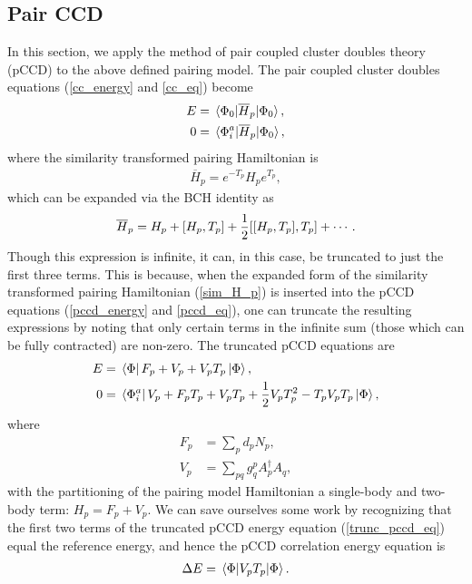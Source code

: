 \documentclass[Dual]{msu-thesis}
\begin{document}
\subsection{Pair CCD}

In this section, we apply the method of pair coupled cluster doubles theory (pCCD) to the above defined pairing model. The pair coupled cluster doubles equations (\ref{cc_energy} and \ref{cc_eq}) become
\begin{align}
\label{pccd_energy} 
E&=\mel{\Phi_0}{\overline{H}_p}{\Phi_0},
\\
\label{pccd_eq}
0&=\mel*{\Phi_i^a}{\overline{H}_p}{\Phi_0}
,\end{align}
where the similarity transformed pairing Hamiltonian is
\begin{align}
\overline{H}_p=e^{-T_p}H_pe^{T_p}
,\end{align}
which can be expanded via the BCH identity as
\begin{align}
\label{sim_H_p}
\overline{H}_p=H_p+\comm{H_p}{T_p}+\frac{1}{2}\comm{\comm{H_p}{T_p}}{T_p}+\cdots
.\end{align}
Though this expression is infinite, it can, in this case, be truncated to just the first three terms. This is because, when the expanded form of the similarity transformed pairing Hamiltonian (\ref{sim_H_p}) is inserted into the pCCD equations (\ref{pccd_energy} and \ref{pccd_eq}), one can truncate the resulting expressions by noting that only certain terms in the infinite sum (those which can be fully contracted) are non-zero. The truncated pCCD equations are
\begin{align}
\label{trunc_pccd_e}
E
&=
\bra*{\Phi}F_p+V_p+V_pT_p\ket{\Phi},
\\
\label{trunc_pccd_eq}
0
&=
\bra*{\Phi_i^a}V_p+F_pT_p+V_pT_p+\frac{1}{2}V_pT_p^2-T_pV_pT_p\ket{\Phi}
,\end{align}
where
\begin{align}
F_p
&=
\sum_pd_pN_p,
\\
V_p
&=
\sum_{pq}g^p_qA^\dagger_pA_q
,\end{align}
with the partitioning of the pairing model Hamiltonian a single-body and two-body term: $H_p=F_p+V_p$. We can save ourselves some work by recognizing that the first two terms of the truncated pCCD energy equation (\ref{trunc_pccd_eq}) equal the reference energy, and hence the pCCD correlation energy equation is
\begin{align}
\label{pccd_e_corr}
\Delta E = \mel{\Phi}{V_pT_p}{\Phi}
.\end{align}
\end{document}
